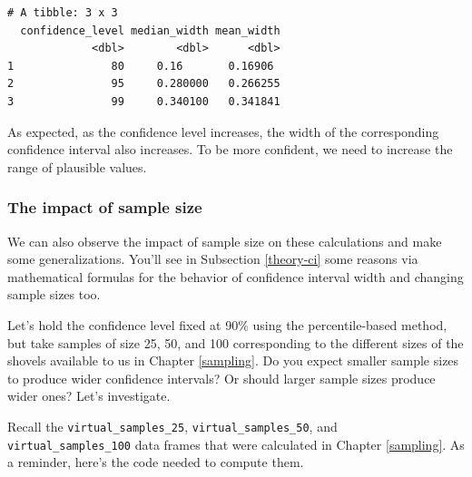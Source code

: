 \documentclass[12pt, krantz2,]{krantz}
\makeatletter
\newenvironment{Shaded}{\begin{snugshade}}{\end{snugshade}}
\newcommand{\DataTypeTok}[1]{\textcolor[rgb]{0.27,0.27,0.27}{#1}}
\newcommand{\DecValTok}[1]{\textcolor[rgb]{0.06,0.06,0.06}{#1}}
\newcommand{\KeywordTok}[1]{\textcolor[rgb]{0.27,0.27,0.27}{\textbf{#1}}}
\newcommand{\NormalTok}[1]{#1}
\newcommand{\OperatorTok}[1]{\textcolor[rgb]{0.43,0.43,0.43}{\textbf{#1}}}
\newcommand{\OtherTok}[1]{\textcolor[rgb]{0.37,0.37,0.37}{#1}}
\newcommand{\StringTok}[1]{\textcolor[rgb]{0.5,0.5,0.5}{#1}}
\newenvironment{kframe}{%
\medskip{}
\setlength{\fboxsep}{.8em}
 \def\at@end@of@kframe{}%
 \ifinner\ifhmode%
  \def\at@end@of@kframe{\end{minipage}}%
  \begin{minipage}{\columnwidth}%
 \fi\fi%
 \def\FrameCommand##1{\hskip\@totalleftmargin \hskip-\fboxsep
 \colorbox{shadecolor}{##1}\hskip-\fboxsep
     \hskip-\linewidth \hskip-\@totalleftmargin \hskip\columnwidth}%
 \MakeFramed {\advance\hsize-\width
   \@totalleftmargin\z@ \linewidth\hsize
   \@setminipage}}%
 {\par\unskip\endMakeFramed%
 \at@end@of@kframe}
\renewenvironment{Shaded}{\begin{kframe}}{\end{kframe}}
\makeatother
\begin{document}
\begin{verbatim}
# A tibble: 3 x 3
  confidence_level median_width mean_width
             <dbl>        <dbl>      <dbl>
1               80     0.16       0.16906 
2               95     0.280000   0.266255
3               99     0.340100   0.341841
\end{verbatim}

As expected, as the confidence level increases, the width of the corresponding confidence interval also increases. To be more confident, we need to increase the range of plausible values.

\hypertarget{the-impact-of-sample-size}{%
\subsubsection*{The impact of sample size}\label{the-impact-of-sample-size}}


We can also observe the impact of sample size on these calculations and make some generalizations. You'll see in Subsection \ref{theory-ci} some reasons via mathematical formulas for the behavior of confidence interval width and changing sample sizes too.

Let's hold the confidence level fixed at 90\% using the percentile-based method, but take samples of size 25, 50, and 100 corresponding to the different sizes of the shovels available to us in Chapter \ref{sampling}. Do you expect smaller sample sizes to produce wider confidence intervals? Or should larger sample sizes produce wider ones? Let's investigate.

Recall the \texttt{virtual\_samples\_25}, \texttt{virtual\_samples\_50}, and \texttt{virtual\_samples\_100} data frames that were calculated in Chapter \ref{sampling}. As a reminder, here's the code needed to compute them.

\begin{Shaded}
\end{Shaded}
\end{document}

